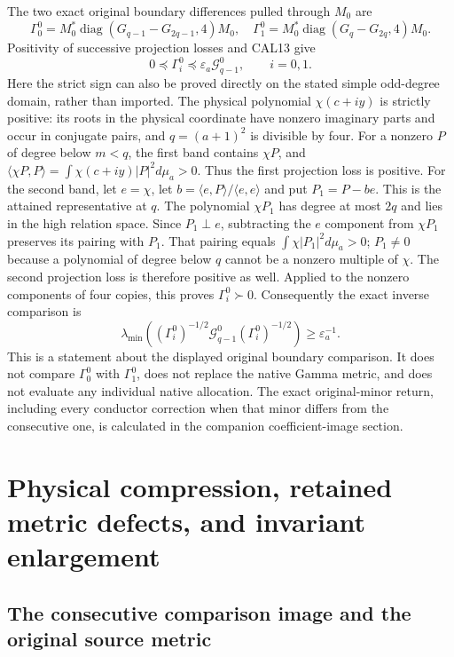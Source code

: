 The two exact original boundary differences pulled through $M_0$ are
\[
 \Gamma_0^0=M_0^*\operatorname{diag}(G_{q-1}-G_{2q-1},4)M_0,
 \quad
 \Gamma_1^0=M_0^*\operatorname{diag}(G_q-G_{2q},4)M_0.
 \tag{CAL16}
\]
Positivity of successive projection losses and CAL13 give
\[
 0\preceq\Gamma_i^0\preceq
       \varepsilon_a\mathcal G_{q-1}^0,\qquad i=0,1.
 \tag{CAL17}
\]
Here the strict sign can also be proved directly on the stated
simple odd-degree domain, rather than imported. The physical
polynomial $\chi(c+iy)$ is strictly positive: its roots in the
physical coordinate have nonzero imaginary parts and occur in
conjugate pairs, and $q=(a+1)^2$ is divisible by four. For a
nonzero $P$ of degree below $m<q$, the first band contains $\chi P$,
and $\langle\chi P,P\rangle=\int\chi(c+iy)|P|^2d\mu_a>0$.
Thus the first projection loss is positive. For the second band,
let $e=\chi$, let $b=\langle e,P\rangle/\langle e,e\rangle$
and put $P_1=P-be$. This is the attained representative at $q$.
The polynomial $\chi P_1$ has degree at most $2q$ and lies in
the high relation space. Since $P_1\perp e$, subtracting the
$e$ component from $\chi P_1$ preserves its pairing with $P_1$.
That pairing equals $\int\chi|P_1|^2d\mu_a>0$; $P_1\ne0$
because a polynomial of degree below $q$ cannot be a nonzero
multiple of $\chi$. The second projection loss is therefore
positive as well. Applied to the nonzero components of four copies,
this proves $\Gamma_i^0\succ0$.
Consequently the exact inverse comparison is
\[
 \lambda_{\min}\!\left((\Gamma_i^0)^{-1/2}
       \mathcal G_{q-1}^0(\Gamma_i^0)^{-1/2}\right)
       \ge\varepsilon_a^{-1}.
 \tag{CAL18}
\]
This is a statement about the displayed original boundary comparison.
It does not compare $\Gamma_0^0$ with $\Gamma_1^0$, does not replace
the native Gamma metric, and does not evaluate any individual
native allocation. The exact original-minor return, including every
conductor correction when that minor differs from the consecutive
one, is calculated in the companion coefficient-image section.


\section{Physical compression, retained metric defects, and invariant enlargement}

\subsection{The consecutive comparison image and the original source metric}


